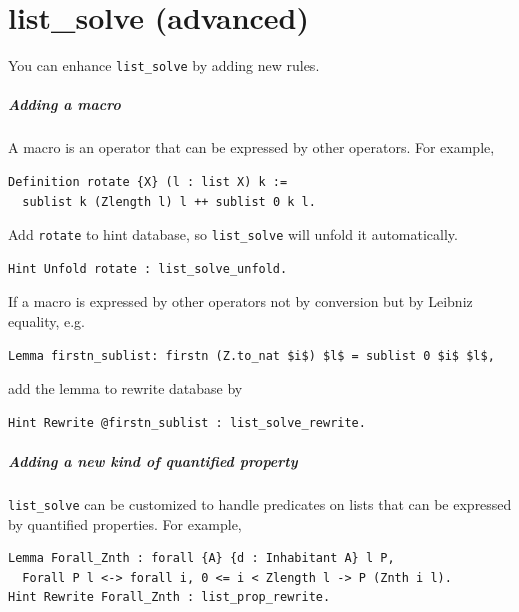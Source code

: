 \documentclass[12pt,fleqn,openany,oneside,showtrims]{memoir}
\begin{document}
\chapter{list\_solve (advanced)}
\label{refcard:list_solve-advanced}
You can enhance \lstinline{list_solve} by adding new rules.

\paragraph{Adding a macro} A macro is an operator that can be expressed by other operators.
For example,
\begin{lstlisting}
Definition rotate {X} (l : list X) k :=
  sublist k (Zlength l) l ++ sublist 0 k l.
\end{lstlisting}
\vspace{-\baselineskip}
Add \lstinline{rotate} to hint database, so \lstinline{list_solve} will unfold it automatically.
\begin{lstlisting}
Hint Unfold rotate : list_solve_unfold.
\end{lstlisting}
\vspace{-\baselineskip}
If a macro is expressed by other operators not by conversion but by Leibniz equality, e.g.
\begin{lstlisting}
Lemma firstn_sublist: firstn (Z.to_nat $i$) $l$ = sublist 0 $i$ $l$,
\end{lstlisting}
\vspace{-\baselineskip}
add the lemma to rewrite database by
\begin{lstlisting}
Hint Rewrite @firstn_sublist : list_solve_rewrite.
\end{lstlisting}

\paragraph{Adding a new kind of quantified property}
\lstinline{list_solve} can be customized to handle predicates on lists that can be expressed by quantified properties. For example,
\begin{lstlisting}
Lemma Forall_Znth : forall {A} {d : Inhabitant A} l P,
  Forall P l <-> forall i, 0 <= i < Zlength l -> P (Znth i l).
Hint Rewrite Forall_Znth : list_prop_rewrite.
\end{lstlisting}

\end{document}
